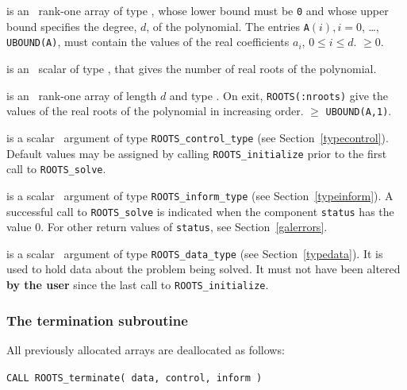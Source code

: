 \documentclass{galahad}
\newcommand{\packagename}{ROOTS}
\begin{document}
\vspace*{-1mm}
\begin{description}
 is an \intentin\ rank-one array of type \realdp, whose 
lower bound must be {\tt 0} and whose upper bound specifies the degree, $d$,
of the polynomial. The entries {\tt A}$(i), i = 0$, \ldots, {\tt UBOUND(A)},
must contain the values of the real coefficients $a_i$, $0 \leq i \leq d$.
 $\geq 0$.

 is an \intentout\ scalar of type \integer,
that gives the number of real roots of the polynomial.

 is an \intentout\ rank-one array of length $d$ and 
type \realdp. On exit, {\tt ROOTS(:nroots)} give the values
of the real roots of the polynomial in increasing order.
 $\geq$ {\tt UBOUND(A,1)}.

 is a scalar \intentin\ argument of type 
{\tt \packagename\_control\_type}
(see Section~\ref{typecontrol}). Default values may be assigned by calling 
{\tt \packagename\_initialize} prior to the first call to 
{\tt \packagename\_solve}.

 is a scalar \intentinout\ argument of type 
{\tt \packagename\_inform\_type}
(see Section~\ref{typeinform}). 
A successful call to
{\tt \packagename\_solve}
is indicated when the  component {\tt status} has the value 0. 
For other return values of {\tt status}, see Section~\ref{galerrors}.

 is a scalar \intentinout\ argument of type 
{\tt \packagename\_data\_type}
(see Section~\ref{typedata}). It is used to hold data about the problem being 
solved. It must not have been altered {\bf by the user} since the last call to 
{\tt \packagename\_initialize}.

\end{description}


\subsubsection{The  termination subroutine}
All previously allocated arrays are deallocated as follows:
\vspace*{1mm}

\hspace{8mm}
{\tt CALL \packagename\_terminate( data, control, inform )}
\end{document}
